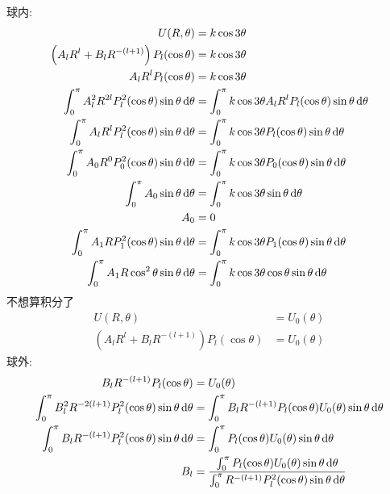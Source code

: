 球内:
\begin{align*}
    U(R,\theta)&=k\cos3\theta\\
    \left(
A_{l} R^l
+
B_{l} R^{-(l+1)}
\right)
P_{l}(\cos\theta)
&=k\cos3\theta\\
A_{l} R^lP_{l}(\cos\theta)
&=k\cos3\theta\\
\int_{0}^{\pi}A_{l}^2 R^{2l}P_{l}^2(\cos\theta)\sin\theta\dif \theta
&=\int_{0}^{\pi}k\cos3\theta  A_{l}R^lP_{l}(\cos\theta)\sin\theta\dif \theta\\
\int_{0}^{\pi}A_{l} R^lP_{l}^2(\cos\theta)\sin\theta\dif \theta
&=\int_{0}^{\pi}k\cos3\theta  P_{l}(\cos\theta)\sin\theta\dif \theta\\
\int_{0}^{\pi}A_{0} R^{0}P_{0}^2(\cos\theta)\sin\theta\dif \theta
&=\int_{0}^{\pi}k\cos3\theta P_{0}(\cos\theta)\sin\theta\dif \theta\\
\int_{0}^{\pi}A_{0}\sin\theta\dif \theta
&=\int_{0}^{\pi}k\cos3\theta\sin\theta\dif \theta\\
A_{0}
&=0\\
\int_{0}^{\pi}A_{1} RP_{1}^2(\cos\theta)\sin\theta\dif \theta
&=\int_{0}^{\pi}k\cos3\theta P_{1}(\cos\theta)\sin\theta\dif \theta\\
\int_{0}^{\pi}A_{1} R\cos^2\theta\sin\theta\dif \theta
&=\int_{0}^{\pi}k\cos3\theta \cos\theta\sin\theta\dif \theta
\end{align*}
不想算积分了
\begin{align*}
    U(R,\theta)&=U_0(\theta)\\
    \left(
A_{l} R^l
+
B_{l} R^{-(l+1)}
\right)
P_{l}(\cos\theta)
&=U_0(\theta)
\end{align*}
球外:
\begin{align*}
B_{l} R^{-(l+1)}
P_{l}(\cos\theta)
&=U_0(\theta)\\
\int_{0}^{\pi}B_{l}^2 R^{-2(l+1)}P_{l}^2(\cos\theta)\sin\theta\dif\theta
&=\int_{0}^{\pi}B_{l} R^{-(l+1)}P_{l}(\cos\theta)U_0(\theta)\sin\theta\dif\theta\\
\int_{0}^{\pi}B_{l} R^{-(l+1)}P_{l}^2(\cos\theta)\sin\theta\dif\theta
&=\int_{0}^{\pi}P_{l}(\cos\theta)U_0(\theta)\sin\theta\dif\theta\\
B_{l}
&=\dfrac{\int_{0}^{\pi}P_{l}(\cos\theta)U_0(\theta)\sin\theta\dif\theta}{\int_{0}^{\pi} R^{-(l+1)}P_{l}^2(\cos\theta)\sin\theta\dif\theta}
\end{align*}
